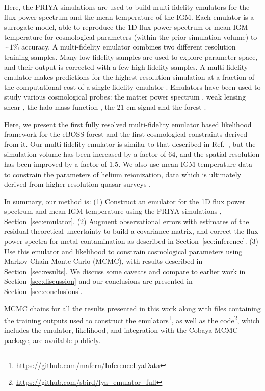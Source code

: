 Here, the PRIYA simulations are used to build multi-fidelity emulators \cite{2019JCAP...02..050B, 2022MNRAS.509.2551H, 2022MNRAS.517.3200F} for the flux power spectrum and the mean temperature of the IGM.
Each emulator is a surrogate model, able to reproduce the 1D flux power spectrum or mean IGM temperature for cosmological parameters (within the prior simulation volume) to $\sim 1 \%$ accuracy.
A multi-fidelity emulator combines two different resolution training samples.
Many low fidelity samples are used to explore parameter space, and their output is corrected with a few high fidelity samples.
A multi-fidelity emulator makes predictions for the highest resolution simulation at a fraction of the computational cost of a single fidelity emulator \cite{10.1093/biomet/87.1.1, 2022MNRAS.509.2551H}.
Emulators have been used to study various cosmological probes: the matter power spectrum \citep{Heitmann:2009, Heitmann:2014, Lawrence:2017, Giblin:2019, Euclid:2021, Arico:2021, Giri:2021}, weak lensing shear \citep{Harnois:2019, Davies:2021}, the halo mass function \citep{McClintock:2019, Nishimichi:2019, Bocquet:2022}, the 21-cm signal \citep{Kern:2017, Cohen:2020, Bevins:2021, Bye:2022} and the \lya forest \citep{2019JCAP...02..050B, Rogers:2019, 2021JCAP...05..033P, 2021JCAP...04..059W, Rogers:2021a,2021PhRvL.126g1302R, 2023MNRAS.tmp.2406C}.

Here, we present the first fully resolved multi-fidelity emulator based likelihood framework for the eBOSS \lya forest and the first cosmological constraints derived from it.
Our multi-fidelity emulator is similar to that described in Ref.~\cite{2022MNRAS.517.3200F}, but the simulation volume has been increased by a factor of $64$, and the spatial resolution has been improved by a factor of $1.5$.
We also use mean IGM temperature data \cite{2021MNRAS.506.4389G} to constrain the parameters of helium reionization, data which is ultimately derived from higher resolution quasar surveys \citep{2017MNRAS.466.4332I, 2022MNRAS.509.2842K, 2019MNRAS.489.2536D}.

In summary, our method is: (1) Construct an emulator for the 1D \lya flux power spectrum and mean IGM temperature using the PRIYA simulations \cite{2023simsuite}, Section~\ref{sec:emulator}.
(2) Augment observational errors with estimates of the residual theoretical uncertainty to build a covariance matrix, and correct the flux power spectra for metal contamination as described in Section~\ref{sec:inference}.
(3) Use this emulator and likelihood to constrain cosmological parameters using Markov Chain Monte Carlo (MCMC), with results described in Section~\ref{sec:results}.
We discuss some caveats and compare to earlier work in Section~\ref{sec:discussion} and our conclusions are presented in Section~\ref{sec:conclusions}.

MCMC chains for all the results presented in this work along with files containing the training outputs used to construct the emulators\footnote{\url{https://github.com/mafern/InferenceLyaData}}, as well as the code\footnote{\url{https://github.com/sbird/lya_emulator_full}}, which includes the emulator, likelihood, and integration with the Cobaya MCMC package, are available publicly.
